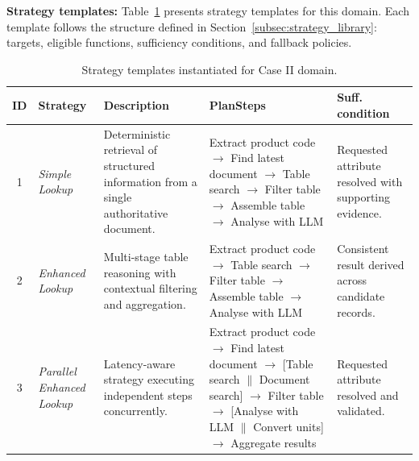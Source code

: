\documentclass[largeformat]{interact}
\begin{document}
\noindent \textbf{Strategy templates:}
Table~\ref{tab:caseII_strategy_templates} presents strategy templates for this domain. Each template follows the structure defined in Section~\ref{subsec:strategy_library}: targets, eligible functions, sufficiency conditions, and fallback policies.

\begin{table}[!htbp]
\captionsetup{width=0.92\linewidth, skip=2pt}
    \caption{Strategy templates instantiated for Case II domain.}
    \label{tab:caseII_strategy_templates}
    \centering
    \small
    \setlength{\tabcolsep}{6pt}
    \renewcommand{\arraystretch}{1.1}
    \begin{tabularx}{\textwidth}{c p{2.2cm} X p{5cm} X}
    
    \toprule
    \textbf{ID} &
    \textbf{Strategy} &
    \textbf{Description} &
    \textbf{PlanSteps} &
    \textbf{Suff. condition} \\
    
    \midrule
    
    1 & \textit{Simple Lookup} &
    Deterministic retrieval of structured information from a single authoritative document. & Extract product code $\rightarrow$ Find latest document $\rightarrow$ Table search
    $\rightarrow$ Filter table $\rightarrow$ Assemble table $\rightarrow$ Analyse with LLM & Requested attribute resolved with supporting evidence. \\
    
    \midrule
    
    2 & \textit{Enhanced Lookup} &
    Multi-stage table reasoning with contextual filtering and aggregation. &
    Extract product code $\rightarrow$ Table search $\rightarrow$ Filter table
    $\rightarrow$ Assemble table $\rightarrow$ Analyse with LLM & Consistent result derived across candidate records. \\
    
    \midrule
    
    3 & \textit{Parallel Enhanced Lookup} &
    Latency-aware strategy executing independent steps concurrently. &
    Extract product code $\rightarrow$ Find latest document $\rightarrow$
    [Table search $\parallel$ Document search]
    $\rightarrow$ Filter table $\rightarrow$
    [Analyse with LLM $\parallel$ Convert units]
    $\rightarrow$ Aggregate results & Requested attribute resolved and validated. \\
    

\end{tabularx}
\end{table}
\end{document}
